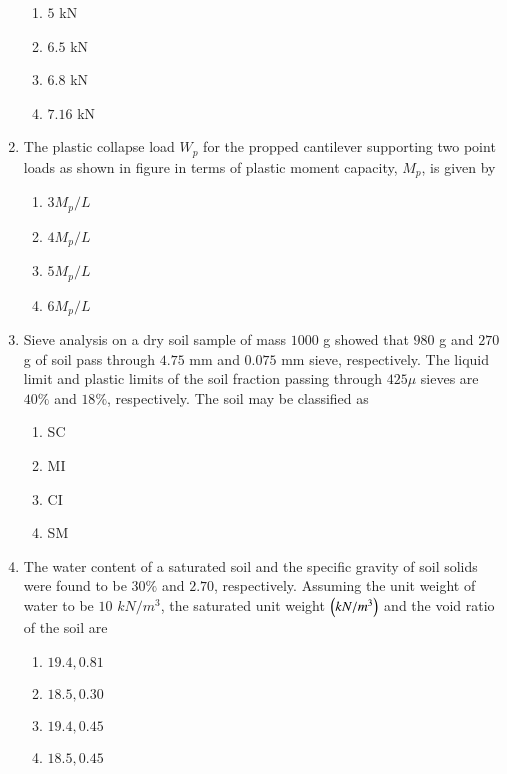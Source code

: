 \documentclass[journal,12pt,onecolumn]{IEEEtran}
\theoremstyle{remark}
\begin{document}
\begin{enumerate}[start=35]
		  \begin{enumerate}
			  \item $5$ kN
			  \item $6.5$ kN
			  \item $6.8$ kN
			  \item $7.16$ kN\\
		  \end{enumerate}
	  \item The plastic collapse load $W_p$ for the propped cantilever supporting two point loads as shown in figure in terms of plastic moment capacity, $M_p$, is given by\\
\begin{figure}[H]
    \centering
\end{figure}
		  \begin{enumerate}
			  \item $3M_p/L$
			  \item $4M_p/L$
			  \item $5M_p/L$
			  \item $6M_p/L$\\
		  \end{enumerate}
	  \item Sieve analysis on a dry soil sample of mass $1000$ g showed that $980$ g and $270$ g of soil pass through $4.75$ mm and $0.075$ mm sieve, respectively. The liquid limit and plastic limits of the soil fraction passing through $425\mu$ sieves are $40\%$ and $18\%$, respectively. The soil may be classified as
		  \begin{enumerate}
			  \item SC
			  \item MI
			  \item CI
			  \item SM\\
		  \end{enumerate}
	  \item The water content of a saturated soil and the specific gravity of soil solids were found to be $30\%$ and $2.70$, respectively. Assuming the unit weight of water to be $10$ $kN/m^3$, the saturated unit weight $\left(kN/m^3\right)$ and the void ratio of the soil are
		  \begin{enumerate}
			  \item $19.4,0.81$
			  \item $18.5,0.30$
			  \item $19.4,0.45$
			  \item $18.5,0.45$\\

\end{enumerate}
\end{enumerate}
\end{document}
